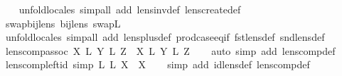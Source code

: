 \begin{isabellebody}
%
\isadelimproof
\ \ %
\endisadelimproof
%
\isatagproof
{}\isamarkupfalse%
\ {\isacharparenleft}unfold{\isacharunderscore}locales{\isacharcomma}\ simp{\isacharunderscore}all\ add{\isacharcolon}\ lens{\isacharunderscore}inv{\isacharunderscore}def\ lens{\isacharunderscore}create{\isacharunderscore}def{\isacharparenright}%
\endisatagproof
{\isafoldproof}%
%
\isadelimproof
\isanewline
%
\endisadelimproof
\ \ \ \ \isanewline
{}\isamarkupfalse%
\ swap{\isacharunderscore}bij{\isacharunderscore}lens{\isacharcolon}\ {\isachardoublequoteopen}bij{\isacharunderscore}lens\ swap\isactrlsub L{\isachardoublequoteclose}\isanewline
%
\isadelimproof
\ \ %
\endisadelimproof
%
\isatagproof
{}\isamarkupfalse%
\ {\isacharparenleft}unfold{\isacharunderscore}locales{\isacharcomma}\ simp{\isacharunderscore}all\ add{\isacharcolon}\ lens{\isacharunderscore}plus{\isacharunderscore}def\ prod{\isachardot}case{\isacharunderscore}eq{\isacharunderscore}if\ fst{\isacharunderscore}lens{\isacharunderscore}def\ snd{\isacharunderscore}lens{\isacharunderscore}def{\isacharparenright}%
\endisatagproof
{\isafoldproof}%
%
\isadelimproof
%
\endisadelimproof
%
\isamarkuptrue%
\isamarkupfalse%
\ lens{\isacharunderscore}comp{\isacharunderscore}assoc{\isacharcolon}\ {\isachardoublequoteopen}{\isacharparenleft}X\ {\isacharsemicolon}\isactrlsub L\ Y{\isacharparenright}\ {\isacharsemicolon}\isactrlsub L\ Z\ {\isacharequal}\ X\ {\isacharsemicolon}\isactrlsub L\ {\isacharparenleft}Y\ {\isacharsemicolon}\isactrlsub L\ Z{\isacharparenright}{\isachardoublequoteclose}\isanewline
%
\isadelimproof
\ \ %
\endisadelimproof
%
\isatagproof
{}\isamarkupfalse%
\ {\isacharparenleft}auto\ simp\ add{\isacharcolon}\ lens{\isacharunderscore}comp{\isacharunderscore}def{\isacharparenright}%
\endisatagproof
{\isafoldproof}%
%
\isadelimproof
\isanewline
%
\endisadelimproof
\isanewline
{}\isamarkupfalse%
\ lens{\isacharunderscore}comp{\isacharunderscore}left{\isacharunderscore}id\ {\isacharbrackleft}simp{\isacharbrackright}{\isacharcolon}\ {\isachardoublequoteopen}{}\isactrlsub L\ {\isacharsemicolon}\isactrlsub L\ X\ {\isacharequal}\ X{\isachardoublequoteclose}\isanewline
%
\isadelimproof
\ \ %
\endisadelimproof
%
\isatagproof
{}\isamarkupfalse%
\ {\isacharparenleft}simp\ add{\isacharcolon}\ id{\isacharunderscore}lens{\isacharunderscore}def\ lens{\isacharunderscore}comp{\isacharunderscore}def{\isacharparenright}%
\endisatagproof
{\isafoldproof}%
%
\isadelimproof
\isanewline
%

\end{isabellebody}
